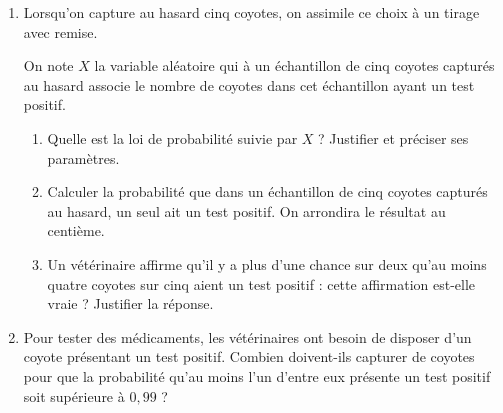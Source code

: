 \begin{enumerate}
\item Lorsqu'on capture au hasard cinq coyotes, on assimile ce choix à un tirage avec remise.

On note $X$ la variable aléatoire qui à un échantillon de cinq coyotes capturés au hasard associe le nombre de coyotes dans cet échantillon ayant un test positif.
\begin{enumerate}
\item Quelle est la loi de probabilité suivie par $X$ ? Justifier et préciser ses paramètres.
\item Calculer la probabilité que dans un échantillon de cinq coyotes capturés au hasard, un seul ait un test positif. On arrondira le résultat au centième.
\item Un vétérinaire affirme qu'il y a plus d'une chance sur deux qu'au moins quatre coyotes sur cinq aient un test positif : cette affirmation est-elle vraie ? Justifier la réponse.
	\end{enumerate}	
\item Pour tester des médicaments, les vétérinaires ont besoin de disposer d'un coyote présentant un test positif. Combien doivent-ils capturer de coyotes pour que la probabilité qu'au moins l'un d'entre eux présente un test positif soit supérieure à $0,99$ ?
\end{enumerate}

\bigskip
